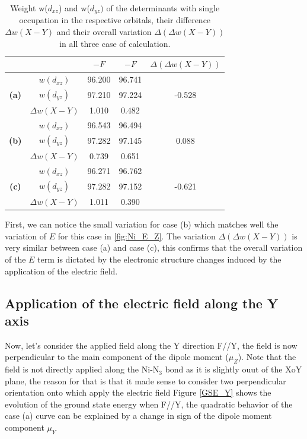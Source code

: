 \documentclass[10pt]{report}
\numberwithin{equation}{section}
\begin{document}
\begin{table}[h]
    \centering
    \begin{tabular}{c | c | c c | c }
        & &  $-F$ & $-F$ & $\Delta (\Delta w(X-Y))$\\
        \hline
        \multirow{3}{*}{\textbf{(a)}}
        &$w(d_{xz})$ &  96.200 & 96.741 & \\
        &$w(d_{yz})$ &  97.210 & 97.224 & -0.528\\
        &$\Delta w(X-Y)$ & 1.010 & 0.482& \\
        \hline
        \multirow{3}{*}{\textbf{(b)}}
        &$w(d_{xz})$ &  96.543 & 96.494 & \\
        &$w(d_{yz})$ &  97.282 & 97.145 & 0.088\\
        &$\Delta w(X-Y)$ & 0.739 & 0.651& \\
        \hline
        \multirow{3}{*}{\textbf{(c)}}
        &$w(d_{xz})$ &  96.271 & 96.762 & \\
        &$w(d_{yz})$ &  97.282 & 97.152 & -0.621\\
        &$\Delta w(X-Y)$ & 1.011 & 0.390& \\
        \hline
    \end{tabular}
    \caption{Weight w($d_{xz}$) and w($d_{yz})$ of the determinants with single occupation in the respective orbitals, their difference $\Delta w(X-Y)$ and their overall variation $\Delta (\Delta w(X-Y))$ in all three case of calculation. }
    \label{tab:PoidsZ}
\end{table}

First, we can notice the small variation for case (b) which matches well the variation of $E$ for this case in \ref{fig:Ni_E_Z}.
The variation $\Delta (\Delta w(X-Y))$ is very similar between case (a) and case (c), this confirms that the overall variation of the $E$ term is dictated by the electronic structure changes induced by the application of the electric field.


\subsection{Application of the electric field along the Y axis}

Now, let's consider the applied field along the Y direction F//Y, the field is now perpendicular to the main component of the dipole moment ($\mu_Z$).
Note that the field is not directly applied along the Ni-N$_3$ bond as it is slightly ouut of the XoY plane, the reason for that is that it made sense to consider two perpendicular orientation onto which apply the electric field
Figure \ref{GSE_Y} shows the evolution of the ground state energy when F//Y, the quadratic behavior of the case (a) curve can be explained by a change in sign of the dipole moment component $\mu_Y$
\end{document}
